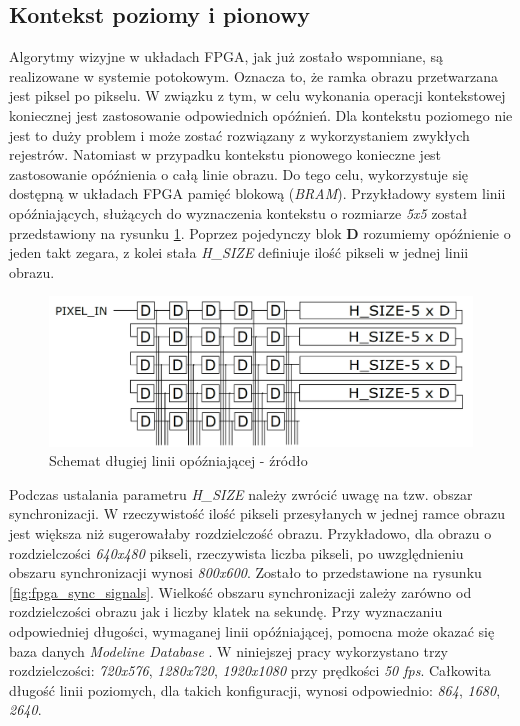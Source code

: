 \subsection{Kontekst poziomy i pionowy}
\label{subsec:fpga_kontekst}

Algorytmy wizyjne w układach FPGA, jak już zostało wspomniane, są realizowane w systemie potokowym. Oznacza to, że ramka obrazu przetwarzana jest piksel po pikselu. W związku z tym, w celu wykonania operacji kontekstowej koniecznej jest zastosowanie odpowiednich opóźnień. Dla kontekstu poziomego nie jest to duży problem i może zostać rozwiązany z wykorzystaniem zwykłych rejestrów. Natomiast w przypadku kontekstu pionowego konieczne jest zastosowanie opóźnienia o całą linie obrazu. Do tego celu, wykorzystuje się dostępną w układach FPGA pamięć blokową (\textit{BRAM}). Przykładowy system linii opóźniających, służących do wyznaczenia kontekstu o rozmiarze \textit{5x5} został przedstawiony na rysunku \ref{fig:fpga_delay_line}. Poprzez pojedynczy blok \textbf{D} rozumiemy opóźnienie o jeden takt zegara, z kolei stała \textit{H\_SIZE} definiuje ilość pikseli w jednej linii obrazu.

	\begin{figure}[h!]
	    \centering
		\includegraphics[scale=0.2]{img/4/context.png}
		\caption{Schemat długiej linii opóźniającej - źródło \cite{komorkiewicz_14}}
		\label{fig:fpga_delay_line}
	\end{figure}
	
Podczas ustalania parametru \textit{H\_SIZE} należy zwrócić uwagę na tzw. obszar synchronizacji. W rzeczywistość ilość pikseli przesyłanych w jednej ramce obrazu jest większa niż sugerowałaby rozdzielczość obrazu. Przykładowo, dla obrazu o rozdzielczości \textit{640x480} pikseli, rzeczywista liczba pikseli, po uwzględnieniu obszaru synchronizacji wynosi \textit{800x600}. Zostało to przedstawione na rysunku \ref{fig:fpga_sync_signals}. Wielkość obszaru synchronizacji zależy zarówno od rozdzielczości obrazu jak i liczby klatek na sekundę. Przy wyznaczaniu odpowiedniej długości, wymaganej linii opóźniającej, pomocna może okazać się baza danych \textit{Modeline Database} \cite{modeline_db_web}. W niniejszej pracy wykorzystano trzy rozdzielczości: \textit{720x576}, \textit{1280x720}, \textit{1920x1080} przy prędkości \textit{50 fps}. Całkowita długość linii poziomych, dla takich konfiguracji, wynosi odpowiednio: \textit{864}, \textit{1680}, \textit{2640}.

